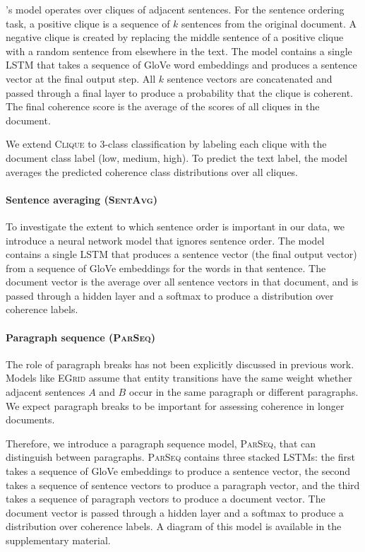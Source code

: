 \documentclass[11pt,a4paper]{article}
\newcommand \egrid{\textsc{EGrid}\xspace}
\newcommand \parseq{\textsc{ParSeq}\xspace}
\newcommand \clique{\textsc{Clique}\xspace}
\newcommand \sentavg{\textsc{SentAvg}\xspace}
\begin{document}
\citet{li-jurafsky:2017:EMNLP}'s model operates over cliques of adjacent sentences. For the sentence ordering task, a positive clique is a sequence of $k$ sentences from the original document. A negative clique is created by replacing the middle sentence of a positive clique with a random sentence from elsewhere in the text. The model contains a single LSTM \cite{Hochreiter1997} that takes a sequence of GloVe word embeddings and produces a sentence vector at the final output step. All $k$ sentence vectors are concatenated and passed through a final layer to produce a probability that the clique is coherent. The final coherence score is the average of the scores of all cliques in the document.

We extend \clique to 3-class classification by labeling each clique with the document class label (low, medium, high). To predict the text label, the model averages the predicted coherence class distributions over all cliques.

\paragraph{Sentence averaging (\sentavg)}

To investigate the extent to which sentence order is important in our data, we introduce a neural network model that ignores sentence order. The model contains a single LSTM that produces a sentence vector (the final output vector) from a sequence of GloVe embeddings for the words in that sentence. The document vector is the average over all sentence vectors in that document, and is passed through a hidden layer and a softmax to produce a distribution over coherence labels. 


\paragraph{Paragraph sequence (\parseq)}

The role of paragraph breaks has not been explicitly discussed in previous work. Models like \egrid assume that entity transitions have the same weight whether adjacent sentences $A$ and $B$ occur in the same paragraph or different paragraphs. We expect paragraph breaks to be important for assessing coherence in longer documents.





Therefore, we introduce a paragraph sequence model, \parseq, that can distinguish between paragraphs. \parseq contains three stacked LSTMs: the first takes a sequence of GloVe embeddings to produce a sentence vector, the second takes a sequence of sentence vectors to produce a paragraph vector, and the third takes a sequence of paragraph vectors to produce a document vector. The document vector is passed through a hidden layer and a softmax to produce a distribution over coherence labels. 
A diagram of this model is available in the supplementary material.
\end{document}
